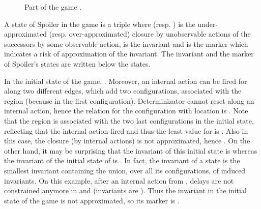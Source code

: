 \documentclass{LMCS}
\theoremstyle{plain}\newtheorem{proposition}[thm]{Proposition}
\begin{document}
\begin{exa}
\begin{figure}[htbp]
\begin{center}
{}
\caption{Part of the game .
}\label{ExJeudet}
\end{center}
\end{figure}

A state of Spoiler in the game is a triple  where
 (resp. ) is the under-approximated (resp. over-approximated) closure by unobservable
actions of the successors by some observable action,  is the invariant and  is the marker which indicates a risk of
approximation of the invariant. The invariant and the marker of
Spoiler's states are written below the states.

In the initial state of the game, . Moreover, an internal action  can be fired for
 along two different edges, which add two configurations,
associated with the region  (because  in the first
configuration). Determinizator cannot reset  along an internal
action, hence the relation for the configuration with location
 is . Note that the region  is associated with
the two last configurations in the initial state, reflecting that the
internal action fired and thus the least value for  is .  Also
in this case, the closure (by internal actions) is not approximated,
hence .  
On the other hand, it may be surprising that the invariant of this
initial state is  whereas the invariant of the initial state of
 is .  In fact, the invariant of a state is the smallest
invariant containing the union, over all its configurations, of induced
invariants.  On this example, after an internal action from ,
delays are not constrained anymore in  and 
(invariants are ).  Thus the invariant in the initial state of
the game is not approximated, so its marker is .



\end{exa}
\end{document}
